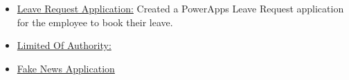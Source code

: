 \documentclass[10pt,a4paper]{altacv}
\begin{document}

\begin{itemize}
\item \underline{Leave Request Application:} Created a PowerApps Leave Request application for the employee to book their leave.

\item \underline{Limited Of Authority:} 
\item \underline{Fake News Application} 



\end{itemize}
\quad










\end{document}
